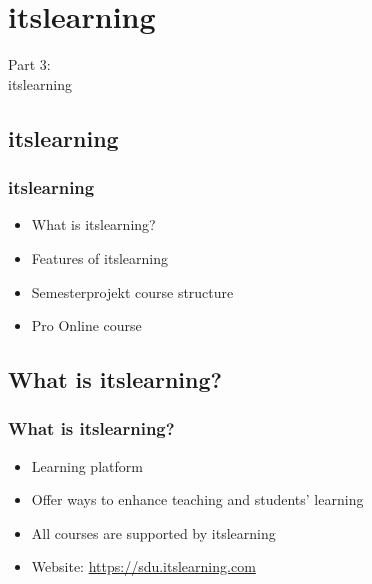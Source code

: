 \documentclass[t, aspectratio=169]{beamer}
\begin{document}
\section{itslearning}
\begin{frame}
  \vspace{25mm}
  \begin{center}
    \Huge{Part 3:\\itslearning}
  \end{center}
\end{frame}

\subsection{itslearning}
\begin{frame}[fragile]
  \frametitle{itslearning}
  
  \vspace{7mm}
  \begin{itemize}
    \setlength\itemsep{7mm}
    \item What is itslearning?
    \item Features of itslearning
    \item Semesterprojekt course structure
    \item Pro Online course
  \end{itemize}
\end{frame}

\subsection{What is itslearning?}
\begin{frame}[fragile]
  \frametitle{What is itslearning?}
  
  \vspace{7mm}
  \begin{itemize}
    \setlength\itemsep{7mm}
    \item Learning platform
    \item Offer ways to enhance teaching and students’ learning
    \item All courses are supported by itslearning
    \item Website: \textcolor{blue}{\url{https://sdu.itslearning.com}}
  \end{itemize}
\end{frame}
\end{document}
